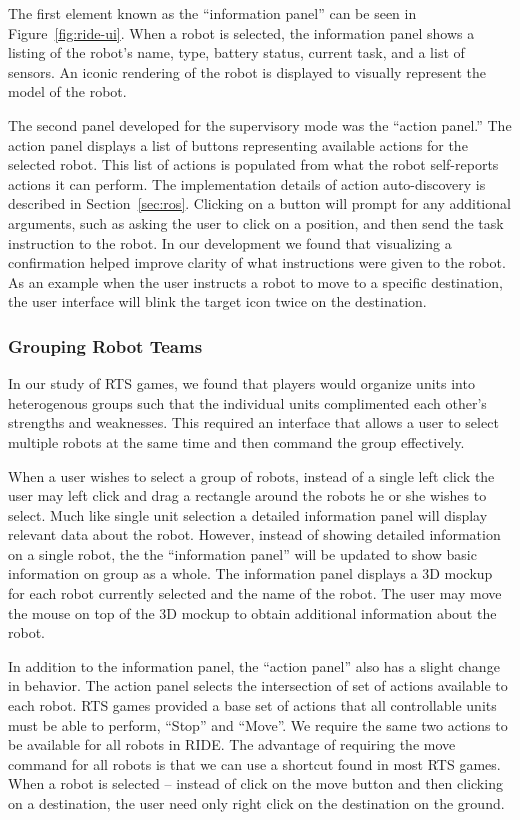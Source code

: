 The first element known as the ``information panel'' can be seen in Figure~\ref{fig:ride-ui}. When a robot is selected, the information panel shows a listing of the robot's name, type, battery status, current task, and a list of sensors. An iconic rendering of the robot is displayed to visually represent the model of the robot.

The second panel developed for the supervisory mode was the ``action panel.'' The action panel displays a list of buttons representing available actions for the selected robot. This list of actions is populated from what the robot self-reports actions it can perform. The implementation details of action auto-discovery is described in Section~\ref{sec:ros}. Clicking on a button will prompt for any additional arguments, such as asking the user to click on a position, and then send the task instruction to the robot. In our development we found that visualizing a confirmation helped improve clarity of what instructions were given to the robot. As an example when the user instructs a robot to move to a specific destination, the user interface will blink the target icon twice on the destination.  

\subsubsection{Grouping Robot Teams} %
\label{ssub:grouping_robot_teams}
In our study of RTS games, we found that players would organize units into heterogenous groups such that the individual units complimented each other's strengths and weaknesses. This required an interface that allows a user to select multiple robots at the same time and then command the group effectively.

When a user wishes to select a group of robots, instead of a single left click the user may left click and drag a rectangle around the robots he or she wishes to select. Much like single unit selection a detailed information panel will display relevant data about the robot. However, instead of showing detailed information on a single robot, the the ``information panel'' will be updated to show basic information on group as a whole. The information panel displays a 3D mockup for each robot currently selected and the name of the robot. The user may move the mouse on top of the 3D mockup to obtain additional information about the robot.

In addition to the information panel, the ``action panel'' also has a slight change in behavior. The action panel selects the intersection of set of actions available to each robot. RTS games provided a base set of actions that all controllable units must be able to perform, ``Stop'' and ``Move''. We require the same two actions to be available for all robots in RIDE. The advantage of requiring the move command for all robots is that we can use a shortcut found in most RTS games. When a robot is selected -- instead of click on the move button and then clicking on a destination, the user need only right click on the destination on the ground.

